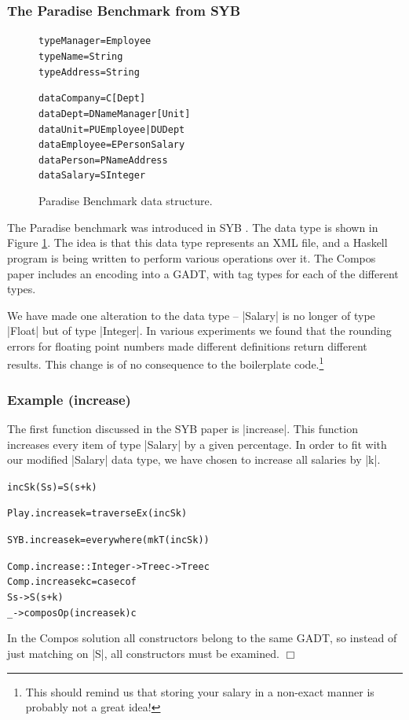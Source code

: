 \documentclass[preprint]{sigplanconf}
\newcommand{\noexample}{\hfill$\Box$}
\newenvironment{code}{\begin{alltt}\small}{\end{alltt}}
\newenvironment{examplename}[1]{\subsubsection*{Example (#1)}}{\noexample}
\begin{document}
\subsubsection{The Paradise Benchmark from SYB}

\begin{figure}
\begin{code}
type Manager   = Employee
type Name      = String
type Address   = String

data Company   = C [Dept]
data Dept      = D Name Manager [Unit]
data Unit      = PU Employee | DU Dept
data Employee  = E Person Salary
data Person    = P Name Address
data Salary    = S Integer
\end{code}
\caption{Paradise Benchmark data structure.}
\label{fig:paradise}
\end{figure}

The Paradise benchmark was introduced in SYB \citep{lammel:syb}. The data type is shown in Figure \ref{fig:paradise}. The idea is that this data type represents an XML file, and a Haskell program is being written to perform various operations over it. The Compos paper includes an encoding into a GADT, with tag types for each of the different types.

We have made one alteration to the data type -- |Salary| is no longer of type |Float| but of type |Integer|. In various experiments we found that the rounding errors for floating point numbers made different definitions return different results. This change is of no consequence to the boilerplate code.\footnote{This should remind us that storing your salary in a non-exact manner is probably not a great idea!}

\begin{examplename}{increase}

The first function discussed in the SYB paper is |increase|. This function increases every item of type |Salary| by a given percentage. In order to fit with our modified |Salary| data type, we have chosen to increase all salaries by |k|.

\begin{code}
incS k (S s) = S (s + k)

Play.increase k = traverseEx (incS k)

SYB.increase k = everywhere (mkT (incS k))

Comp.increase :: Integer -> Tree c -> Tree c
Comp.increase k c = case c of
    S s -> S (s + k)
    _ -> composOp (increase k) c
\end{code}

In the Compos solution all constructors belong to the same GADT, so instead of just matching on |S|, all constructors must be examined.
\end{examplename}
\end{document}
